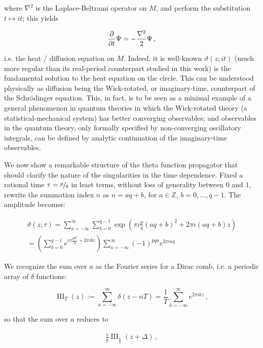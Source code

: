 \documentclass{article}
\newcommand{\T}{\ensuremath{\vartheta}}
\newcommand{\sumZ}{\sum_{n=-\infty}^{\infty}}
\begin{document}
where $\nabla^2$ is the Laplace-Beltrami operator on $M$, and perform the substitution $t \mapsto it$; this yields

\begin{equation}
    \pdv{t} \Psi = - \frac{\nabla^2}{2} \Psi\,,
\end{equation}

i.e. the heat / diffusion equation on $M$. Indeed, it is well-known $\vartheta(z;it)$ (much more regular than its real-period counterpart studied in this work) is the fundamental solution to the heat equation on the circle. This can be understood physically as diffusion being the Wick-rotated, or imaginary-time, counterpart of the Schr\"odinger equation. This, in fact, is to be seen as a minimal example of a general phenomenon in quantum theories in which the Wick-rotated theory (a statistical-mechanical system) has better converging observables; and observables in the quantum theory, only formally specified by non-converging oscillatory integrals, can be defined by analytic continuation of the imaginary-time observables.

We now show a remarkable structure of the theta function propagator that should clarify the nature of the singularities in the time dependence. Fixed a rational time $\tau = \sfrac{p}{q}$ in least terms, without loss of generality between $0$ and $1$, rewrite the summation index $n$ as $n = aq + b$, for $a \in \mathbb{Z}$, $b = 0,\ldots,q-1$. The amplitude becomes:

\newcommand{\sumA}{\sum_{a=-\infty}^\infty}
\newcommand{\sumB}{\sum_{b=0}^{q-1}}
\newcommand{\sumBnorm}{\sum_{b=0}^{|q|-1}}
\newcommand{\comb}{\operatorname{III}}

\begin{align}
    \T(z;\tau) = \sumA \sumB \exp(\pi i \frac{p}{q} (aq + b)^2  + 2\pi i (aq+b) z)\\
    = \left( \sumB e^{i\pi \frac{p b^2}{q} + 2\pi i b z} \right) \sumA (-1)^{pqa} e^{2\pi i a q} 
\end{align}

We recognize the sum over $a$ as the Fourier series for a Dirac comb, i.e. a periodic array of $\delta$ functions:

\begin{equation}
    \comb_T(z) := \sumZ \delta(z-nT) = \frac{1}{T} \sum_{k=-\infty}^\infty e^{2\pi i k z}\,,
\end{equation}

so that the sum over $a$ reduces to

\begin{align}
    \frac{1}{q} \comb_{\frac{1}{q}} (z+\Delta)\,,
\end{align}
\end{document}
